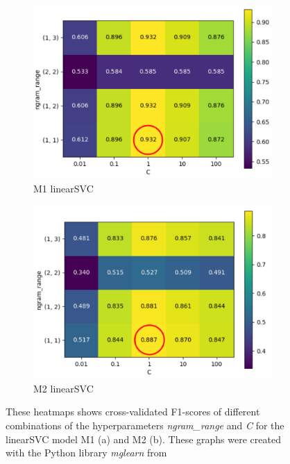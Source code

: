 \begin{figure}[!htb]
 \begin{subfigure}{0.5\textwidth}
   \centering
   \includegraphics[width=0.9\linewidth]{img/m1_F1_ngram_C_heatmap_w_Circle.pdf}
   \caption{M1 linearSVC}
   \label{fig:m1_heatmap}
\end{subfigure}
\begin{subfigure}{0.5\textwidth}
   \centering
   \includegraphics[width=0.9\linewidth]{img/m2_ngram_C_heatmap_new_w_circle.pdf}
   \caption{M2 linearSVC}
   \label{fig:m2_heatmap}
 \end{subfigure}
\caption{These heatmaps shows cross-validated F1-scores of different combinations of the hyperparameters \textit{ngram\_range} and \textit{C} for the linearSVC model M1 (a) and M2 (b). These graphs were created with the Python library \textit{mglearn} from \textcite{Guido2016}}
\label{fig:heatmaps}
\end{figure}

